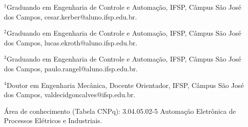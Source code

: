 \begin{center}




\end{center}

\begingroup
    \fontsize{9pt}{11pt}\selectfont
  
  $^1$Graduando em Engenharia de Controle e Automação, IFSP, Câmpus São José dos Campos, cesar.kerber@aluno.ifsp.edu.br.
  
  $^2$Graduando em Engenharia de Controle e Automação, IFSP, Câmpus São José dos Campos, lucas.ekroth@aluno.ifsp.edu.br.
  
  $^3$Graduando em Engenharia de Controle e Automação, IFSP, Câmpus São José dos Campos, paulo.rangel@aluno.ifsp.edu.br.
  
  $^4$Doutor em Engenharia Mecânica, Docente Orientador, IFSP, Câmpus São José dos Campos, valdecidgoncalves@ifsp.edu.br.

Área de conhecimento (Tabela CNPq): 3.04.05.02-5 Automação Eletrônica de Processos Elétricos e Industriais.
\endgroup

